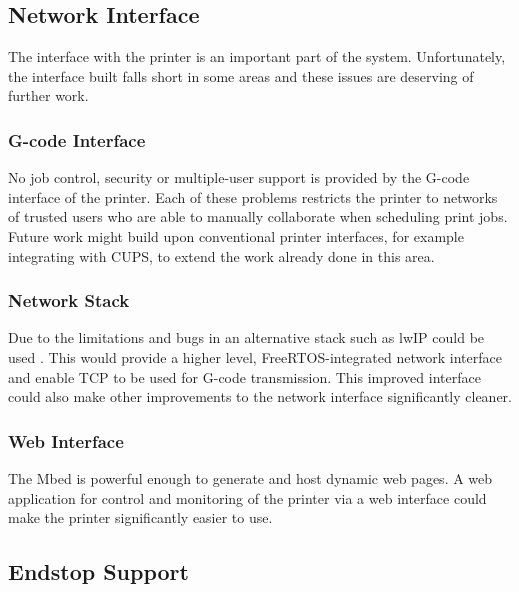 		\subsection{Network Interface}
			
			\label{sec:future_network}
			
			The interface with the printer is an important part of the system.
			Unfortunately, the interface built falls short in some areas and these
			issues are deserving of further work.
			
			\subsubsection{G-code Interface}
				
				No job control, security or multiple-user support is provided by the
				G-code interface of the printer. Each of these problems restricts the
				printer to networks of trusted users who are able to manually
				collaborate when scheduling print jobs. Future work might build upon
				conventional printer interfaces, for example integrating with CUPS, to
				extend the work already done in this area.
			
			\subsubsection{Network Stack}
				
				Due to the limitations and bugs in \uIP{} an alternative stack such as
				lwIP could be used \cite{lwip}. This would provide a higher level,
				FreeRTOS-integrated network interface and enable TCP to be used for
				G-code transmission. This improved interface could also make other
				improvements to the network interface significantly cleaner.
			
			\subsubsection{Web Interface}
				
				The Mbed is powerful enough to generate and host dynamic web pages. A
				web application for control and monitoring of the printer via a web
				interface could make the printer significantly easier to use.
		
		\subsection{Endstop Support}
			
			\label{sec:future_endstop}
			
